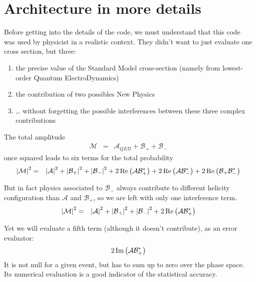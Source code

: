 \documentclass[a4paper]{article}
\begin{document}
\section{Architecture in more details}
Before getting into the details of the code, we must understand that this code was used by physicist in a realistic context.
They didn't want to just evaluate one cross section, but three:
\begin{enumerate}
\item the precise value of the Standard Model cross-section (namely from lowest-order Quantum ElectroDynamics)
\item the contribution of two possibles New Physics
\item … without forgetting the possible interferences between these three complex contributions
\end{enumerate}
The total amplitude
\begin{eqnarray}
  \mathcal{M}  &=&  \mathcal{A}_{QED} + \mathcal{B}_+ + \mathcal{B}_-
\end{eqnarray}
once squared leads to six terms for the total probability
\begin{eqnarray}
\mathcal{\left|M\right|}^2
&=&
 \left|\mathcal{A}\right|^2
+\left|\mathcal{B}_+\right|^2
+\left|\mathcal{B}_-\right|^2
+2\,\hbox{Re}\left({\mathcal{A}\mathcal{B}_+^*}\right)
+2\,\hbox{Re}\left({\mathcal{A}\mathcal{B}_-^*}\right)
+2\,\hbox{Re}\left({\mathcal{B}_+\mathcal{B}_-^*}\right)
\end{eqnarray}

But in fact physics associated to $\mathcal{B}_-$ always contribute to different helicity configuration than $\mathcal{A}$ and $\mathcal{B}_+$, so we are left with only one interference term.
\begin{eqnarray}
\mathcal{\left|M\right|}^2
&=&
 \left|\mathcal{A}\right|^2
+\left|\mathcal{B}_+\right|^2
+\left|\mathcal{B}_-\right|^2
+2\,\hbox{Re}\left({\mathcal{A}\mathcal{B}_+^*}\right)
\end{eqnarray}

Yet we will evaluate a fifth term (although it doesn't contribute), as an error evaluator:
\begin{eqnarray}
 2\,\hbox{Im}\left({\mathcal{A}\mathcal{B}_+^*}\right)
\end{eqnarray}
It is not null for a given event, but has to sum up to zero over the phase space.
Its numerical evaluation is a good indicator of the statistical accuracy.
\end{document}
